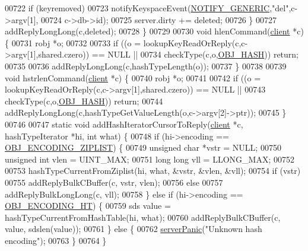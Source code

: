 \begin{DoxyCode}
00722         \textcolor{keywordflow}{if} (keyremoved)
00723             notifyKeyspaceEvent(\hyperlink{server_8h_a9fa53dd1068e62365f3964ad3479eec2}{NOTIFY\_GENERIC},\textcolor{stringliteral}{"del"},c->argv[1],
00724                                 c->db->id);
00725         server.dirty += deleted;
00726     \}
00727     addReplyLongLong(c,deleted);
00728 \}
00729 
00730 \textcolor{keywordtype}{void} hlenCommand(\hyperlink{structclient}{client} *c) \{
00731     robj *o;
00732 
00733     \textcolor{keywordflow}{if} ((o = lookupKeyReadOrReply(c,c->argv[1],shared.czero)) == NULL ||
00734         checkType(c,o,\hyperlink{server_8h_a87c05ba4f7f36741864277f02a4423fb}{OBJ\_HASH})) \textcolor{keywordflow}{return};
00735 
00736     addReplyLongLong(c,hashTypeLength(o));
00737 \}
00738 
00739 \textcolor{keywordtype}{void} hstrlenCommand(\hyperlink{structclient}{client} *c) \{
00740     robj *o;
00741 
00742     \textcolor{keywordflow}{if} ((o = lookupKeyReadOrReply(c,c->argv[1],shared.czero)) == NULL ||
00743         checkType(c,o,\hyperlink{server_8h_a87c05ba4f7f36741864277f02a4423fb}{OBJ\_HASH})) \textcolor{keywordflow}{return};
00744     addReplyLongLong(c,hashTypeGetValueLength(o,c->argv[2]->ptr));
00745 \}
00746 
00747 \textcolor{keyword}{static} \textcolor{keywordtype}{void} addHashIteratorCursorToReply(\hyperlink{structclient}{client} *c, hashTypeIterator *hi, \textcolor{keywordtype}{int} what) \{
00748     \textcolor{keywordflow}{if} (hi->encoding == \hyperlink{server_8h_aabf064ede983103f1fd0df2086e84eee}{OBJ\_ENCODING\_ZIPLIST}) \{
00749         \textcolor{keywordtype}{unsigned} \textcolor{keywordtype}{char} *vstr = NULL;
00750         \textcolor{keywordtype}{unsigned} \textcolor{keywordtype}{int} vlen = UINT\_MAX;
00751         \textcolor{keywordtype}{long} \textcolor{keywordtype}{long} vll = LLONG\_MAX;
00752 
00753         hashTypeCurrentFromZiplist(hi, what, &vstr, &vlen, &vll);
00754         \textcolor{keywordflow}{if} (vstr)
00755             addReplyBulkCBuffer(c, vstr, vlen);
00756         \textcolor{keywordflow}{else}
00757             addReplyBulkLongLong(c, vll);
00758     \} \textcolor{keywordflow}{else} \textcolor{keywordflow}{if} (hi->encoding == \hyperlink{server_8h_a9c10219f68afc557d510d108257d238b}{OBJ\_ENCODING\_HT}) \{
00759         sds value = hashTypeCurrentFromHashTable(hi, what);
00760         addReplyBulkCBuffer(c, value, sdslen(value));
00761     \} \textcolor{keywordflow}{else} \{
00762         \hyperlink{server_8h_a11cc378e7778a830b41240578de3b204}{serverPanic}(\textcolor{stringliteral}{"Unknown hash encoding"});
00763     \}
00764 \}

\end{DoxyCode}
